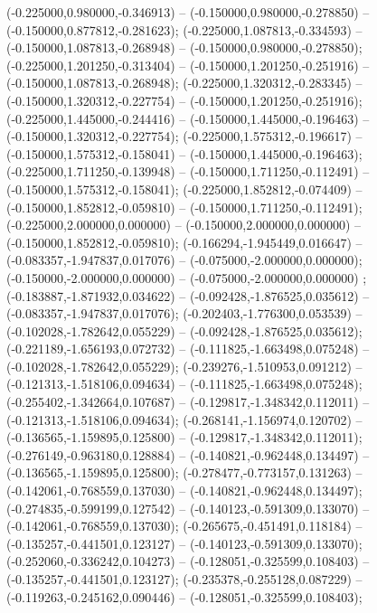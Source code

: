  (-0.225000,0.980000,-0.346913) -- (-0.150000,0.980000,-0.278850) -- (-0.150000,0.877812,-0.281623);
 (-0.225000,1.087813,-0.334593) -- (-0.150000,1.087813,-0.268948) -- (-0.150000,0.980000,-0.278850);
 (-0.225000,1.201250,-0.313404) -- (-0.150000,1.201250,-0.251916) -- (-0.150000,1.087813,-0.268948);
 (-0.225000,1.320312,-0.283345) -- (-0.150000,1.320312,-0.227754) -- (-0.150000,1.201250,-0.251916);
 (-0.225000,1.445000,-0.244416) -- (-0.150000,1.445000,-0.196463) -- (-0.150000,1.320312,-0.227754);
 (-0.225000,1.575312,-0.196617) -- (-0.150000,1.575312,-0.158041) -- (-0.150000,1.445000,-0.196463);
 (-0.225000,1.711250,-0.139948) -- (-0.150000,1.711250,-0.112491) -- (-0.150000,1.575312,-0.158041);
 (-0.225000,1.852812,-0.074409) -- (-0.150000,1.852812,-0.059810) -- (-0.150000,1.711250,-0.112491);
 (-0.225000,2.000000,0.000000) -- (-0.150000,2.000000,0.000000) -- (-0.150000,1.852812,-0.059810);
 (-0.166294,-1.945449,0.016647) -- (-0.083357,-1.947837,0.017076) -- (-0.075000,-2.000000,0.000000);
 (-0.150000,-2.000000,0.000000) -- (-0.075000,-2.000000,0.000000) ;
 (-0.183887,-1.871932,0.034622) -- (-0.092428,-1.876525,0.035612) -- (-0.083357,-1.947837,0.017076);
 (-0.202403,-1.776300,0.053539) -- (-0.102028,-1.782642,0.055229) -- (-0.092428,-1.876525,0.035612);
 (-0.221189,-1.656193,0.072732) -- (-0.111825,-1.663498,0.075248) -- (-0.102028,-1.782642,0.055229);
 (-0.239276,-1.510953,0.091212) -- (-0.121313,-1.518106,0.094634) -- (-0.111825,-1.663498,0.075248);
 (-0.255402,-1.342664,0.107687) -- (-0.129817,-1.348342,0.112011) -- (-0.121313,-1.518106,0.094634);
 (-0.268141,-1.156974,0.120702) -- (-0.136565,-1.159895,0.125800) -- (-0.129817,-1.348342,0.112011);
 (-0.276149,-0.963180,0.128884) -- (-0.140821,-0.962448,0.134497) -- (-0.136565,-1.159895,0.125800);
 (-0.278477,-0.773157,0.131263) -- (-0.142061,-0.768559,0.137030) -- (-0.140821,-0.962448,0.134497);
 (-0.274835,-0.599199,0.127542) -- (-0.140123,-0.591309,0.133070) -- (-0.142061,-0.768559,0.137030);
 (-0.265675,-0.451491,0.118184) -- (-0.135257,-0.441501,0.123127) -- (-0.140123,-0.591309,0.133070);
 (-0.252060,-0.336242,0.104273) -- (-0.128051,-0.325599,0.108403) -- (-0.135257,-0.441501,0.123127);
 (-0.235378,-0.255128,0.087229) -- (-0.119263,-0.245162,0.090446) -- (-0.128051,-0.325599,0.108403);
